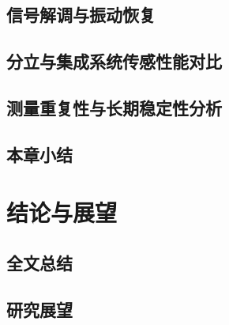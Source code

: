 \section{信号解调与振动恢复}
\section{分立与集成系统传感性能对比}
\section{测量重复性与长期稳定性分析}
\section{本章小结}

\chapter{结论与展望}
\thispagestyle{main}

\section{全文总结}
\section{研究展望}
